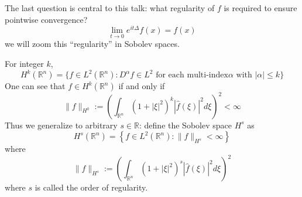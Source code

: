\documentclass[openany]{book}
\newcommand{\R}{\mathbb{R}}
\begin{document}
The last question is central to this talk: what regularity of $f$ is required to ensure pointwise convergence?
\begin{equation*}
    \lim_{t\to 0}e^{it\Delta}f(x)=f(x)
\end{equation*}
we will zoom this ``regularity'' in Sobolev spaces. 
\begin{defn}
    For integer $k$, 
    \begin{equation*}
        H^k(\R^n)=\{f\in L^2(\R^n):D^{\alpha}f\in L^2 \text{ for each multi-index} \alpha \text{ with }|\alpha|\leq k\}
    \end{equation*}
    One can see that $f\in H^k(\R^n)$ if and only if
    \begin{equation*}
        \|f\|_{H^k}:=\left(\int_{\R^n}(1+|\xi|^2)^k|\hat{f}(\xi)|^2d\xi\right)^2<\infty
    \end{equation*}
    Thus we generalize to arbitrary $s\in\R$: define the Sobolev space $H^s$ as 
    \begin{equation*}
        H^s(\R^n)=\left\{f\in L^2(\R^n): \|f\|_{H^s}<\infty\right\}
    \end{equation*}
    where 
    \begin{equation*}
        \|f\|_{H^s}:=\left(\int_{\R^n}(1+|\xi|^2)^s|\hat{f}(\xi)|^2d\xi\right)^2
    \end{equation*}
    where $s$ is called the order of regularity.
\end{defn}
\end{document}
